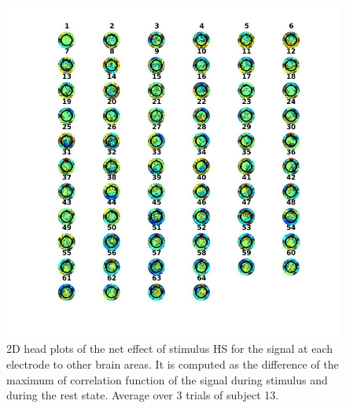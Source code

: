 \documentclass[a4paper]{article}
\begin{document}
\begin{figure}[H]
    \centering
    \includegraphics[width=16cm]{HS1.jpg}
    \caption{2D head plots of the net effect of stimulus HS for the signal at each electrode to other brain areas. It is computed as the difference of the maximum of correlation function of the signal during stimulus and during the rest state. Average over 3 trials of subject 13.}
    \label{fig:hs1}
\end{figure}
\end{document}
